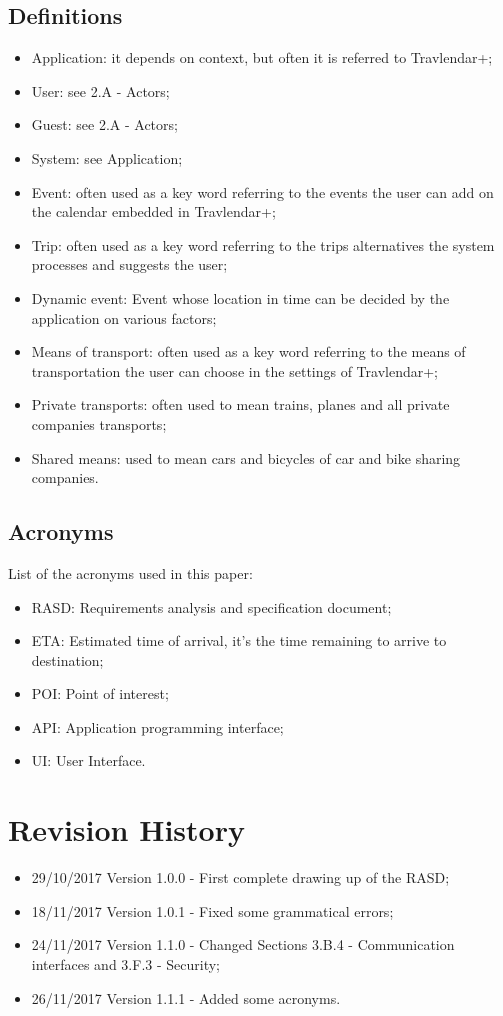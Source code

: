 \subsection{Definitions}
\begin{itemize}
\item Application: it depends on context, but often it is referred to Travlendar+;
\item User: see 2.A - Actors;
\item Guest: see 2.A - Actors;
\item System: see Application;
\item Event: often used as a key word referring to the events the user can add on the calendar embedded in Travlendar+;
\item Trip: often used as a key word referring to the trips alternatives the system processes and suggests the user;
\item Dynamic event: Event whose location in time can be decided by the application on various factors;
\item Means of transport: often used as a key word referring to the means of transportation the user can choose in the settings of Travlendar+;
\item Private transports: often used to mean trains, planes and all private companies transports;
\item Shared means: used to mean cars and bicycles of car and bike sharing companies.
\end{itemize}
%
\subsection{Acronyms}
List of the acronyms used in this paper:
\begin{itemize}
\item RASD: Requirements analysis and specification document;
\item ETA: Estimated time of arrival, it's the time remaining to arrive to destination;
\item POI: Point of interest;
\item API: Application programming interface;
\item UI: User Interface.
\end{itemize}
%
%
\section{Revision History}
\begin{itemize}
\item 29/10/2017 Version 1.0.0 - First complete drawing up of the RASD;
\item 18/11/2017 Version 1.0.1 - Fixed some grammatical errors;
\item 24/11/2017 Version 1.1.0 - Changed Sections 3.B.4 - Communication interfaces and 3.F.3 - Security;
\item 26/11/2017 Version 1.1.1 - Added some acronyms.
\end{itemize}
%
%
